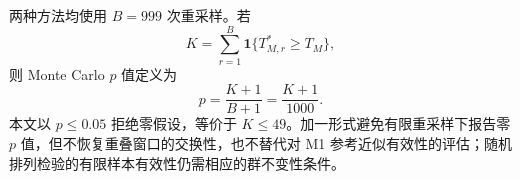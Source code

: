 两种方法均使用 $B=999$ 次重采样。若
\[
 K=\sum_{r=1}^{B}\mathbf 1\{T_{M,r}^*\ge T_M\},
\]
则 Monte Carlo $p$ 值定义为
\begin{equation}\label{eq:mc-pvalue}
 p=\frac{K+1}{B+1}=\frac{K+1}{1000}.
\end{equation}
本文以 $p\le0.05$ 拒绝零假设，等价于 $K\le49$。加一形式避免有限重采样下报告零 $p$ 值\cite{PhipsonSmyth2010}，但不恢复重叠窗口的交换性，也不替代对 M1 参考近似有效性的评估；随机排列检验的有限样本有效性仍需相应的群不变性条件\cite{HemerikGoeman2018}。
